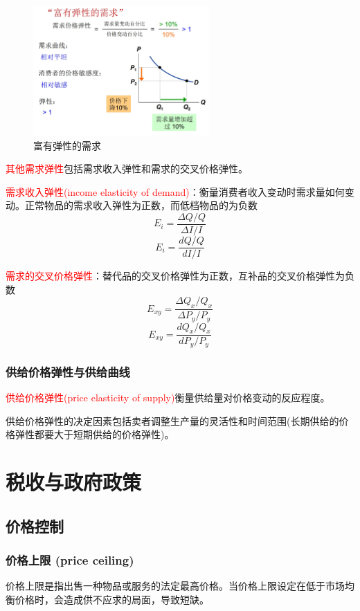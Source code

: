 \documentclass[12pt, a4paper]{article}
\begin{document}
\begin{figure}[H]
  \centering
  \includegraphics[width=0.6\textwidth]{富有弹性的需求.png}
  \caption{富有弹性的需求}
\end{figure}

\textcolor{red}{其他需求弹性}包括需求收入弹性和需求的交叉价格弹性。

\textcolor{red}{需求收入弹性(income elasticity of demand)}：衡量消费者收入变动时需求量如何变动。正常物品的需求收入弹性为正数，而低档物品的为负数
$$E_{i} = \frac{\Delta Q / Q}{\Delta I / I}$$
$$E_{i} = \frac{dQ / Q}{dI / I}$$

\textcolor{red}{需求的交叉价格弹性}：替代品的交叉价格弹性为正数，互补品的交叉价格弹性为负数
$$E_{xy} = \frac{\Delta Q_x / Q_x}{\Delta P_y / P_y}$$
$$E_{xy} = \frac{dQ_x / Q_x}{dP_y / P_y}$$

\subsubsection{供给价格弹性与供给曲线}
\textcolor{red}{供给价格弹性(price elasticity of supply)}衡量供给量对价格变动的反应程度。

供给价格弹性的决定因素包括卖者调整生产量的灵活性和时间范围(长期供给的价格弹性都要大于短期供给的价格弹性)。


\newpage
\section{税收与政府政策}

\subsection{价格控制}

\subsubsection{价格上限 (price ceiling)}
价格上限是指出售一种物品或服务的法定最高价格。当价格上限设定在低于市场均衡价格时，会造成供不应求的局面，导致短缺。
\end{document}
